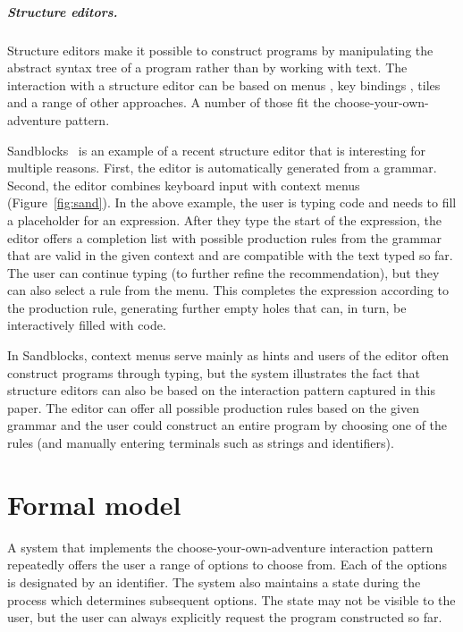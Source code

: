 \documentclass[ a4paper,UKenglish,cleveref, autoref, thm-restate]{lipics-v2021}
\begin{document}

\subparagraph{Structure editors.}
Structure editors make it possible to construct programs by manipulating the abstract syntax tree
of a program rather than by working with text. The interaction with a structure
editor can be based on menus \cite{teitelbaum-1981-synth}, key bindings \cite{weber-2017-editors},
tiles~\cite{moon-2022-tylr} and a range of other approaches. A number of those fit
the choose-your-own-adventure pattern.

Sandblocks~\cite{beckmann-2023-all} is an example of a recent structure editor that is interesting
for multiple reasons. First, the editor is automatically generated from a grammar. Second, the
editor combines keyboard input with context menus (Figure~\ref{fig:sand}). In the above example,
the user is typing code and needs to fill a placeholder for an expression. After they type the
start of the expression, the editor offers a completion list with possible production rules from
the grammar that are valid in the given context and are compatible with the text typed so far. The
user can continue typing (to further refine the recommendation), but they can also select a rule
from the menu. This completes the expression according to the production rule, generating further
empty holes that can, in turn, be interactively filled with code.

In Sandblocks, context menus serve mainly as hints and users of the editor often
construct programs through typing, but the system illustrates the fact that structure editors
can also be based on the interaction pattern captured in this paper. The editor can offer
all possible production rules based on the given grammar and the user could construct an
entire program by choosing one of the rules (and manually entering terminals such as
strings and identifiers).


\section{Formal model}
\label{sec:calculus}

A system that implements the choose-your-own-adventure interaction pattern repeatedly offers
the user a range of options to choose from. Each of the options is designated by an identifier.
The system also maintains a state during the process which determines subsequent options. The state
may not be visible to the user, but the user can always explicitly request the program constructed
so far.
\end{document}
